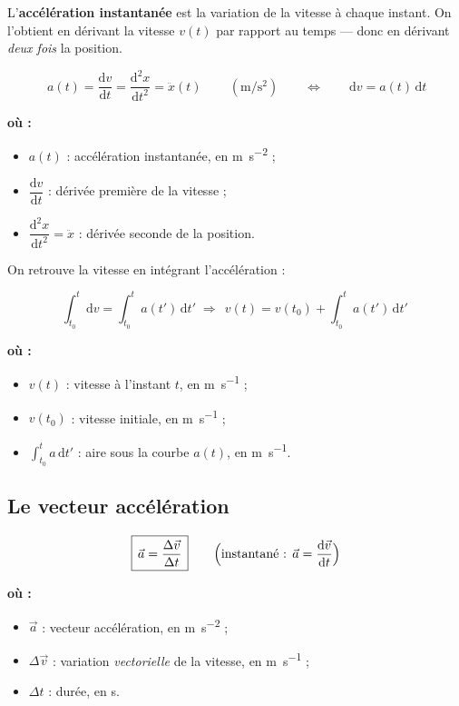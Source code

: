 \documentclass[11pt,a4paper]{article}
\newenvironment{ou}{%
  \par\smallskip\noindent\textbf{où :}\nopagebreak
  \begin{itemize}[leftmargin=1.8em,topsep=2pt,itemsep=1.5pt,parsep=0pt]}%
  {\end{itemize}}
\newcommand{\vv}[1]{\vec{#1}}
\newcommand{\dd}{\mathrm{d}}
\newcommand{\mss}{\si{\metre\per\second\squared}}
\begin{document}
\begin{definition}
L'\textbf{accélération instantanée} est la variation de la vitesse à chaque instant. On l'obtient
en dérivant la vitesse $v(t)$ par rapport au temps — donc en dérivant \emph{deux fois} la position.
\end{definition}

\begin{formule}
\[ \boxed{\,a(t)=\dfrac{\dd v}{\dd t}=\dfrac{\dd^2 x}{\dd t^2}=\ddot{x}(t)\,}\qquad(\mss)
   \qquad\Longleftrightarrow\qquad \dd v=a(t)\,\dd t \]
\begin{ou}
  \item $a(t)$ : accélération instantanée, en \si{\metre\per\second\squared} ;
  \item $\dfrac{\dd v}{\dd t}$ : dérivée première de la vitesse ;
  \item $\dfrac{\dd^2 x}{\dd t^2}=\ddot{x}$ : dérivée seconde de la position.
\end{ou}
\end{formule}

On retrouve la vitesse en intégrant l'accélération :
\begin{formule}
\[ \int_{t_0}^{t}\dd v=\int_{t_0}^{t} a(t')\,\dd t'
   \;\Longrightarrow\;
   \boxed{\,v(t)=v(t_0)+\int_{t_0}^{t} a(t')\,\dd t'\,}\tag{II} \]
\begin{ou}
  \item $v(t)$ : vitesse à l'instant $t$, en \si{\metre\per\second} ;
  \item $v(t_0)$ : vitesse initiale, en \si{\metre\per\second} ;
  \item $\displaystyle\int_{t_0}^{t} a\,\dd t'$ : aire sous la courbe $a(t)$, en \si{\metre\per\second}.
\end{ou}
\end{formule}

\subsection{Le vecteur accélération}

\begin{formule}
\[ \boxed{\,\vv{a}=\dfrac{\Delta\vv{v}}{\Delta t}\,}\qquad
   \Bigl(\text{instantané : } \vv{a}=\dfrac{\dd\vv{v}}{\dd t}\Bigr) \]
\begin{ou}
  \item $\vv{a}$ : vecteur accélération, en \si{\metre\per\second\squared} ;
  \item $\Delta\vv{v}$ : variation \emph{vectorielle} de la vitesse, en \si{\metre\per\second} ;
  \item $\Delta t$ : durée, en \si{\second}.
\end{ou}
\end{formule}
\end{document}
